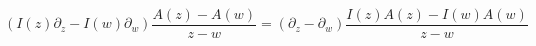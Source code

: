 \begin{equation}
(I(z) \partial_z-I(w) \partial_w)\frac{A(z)-A(w)}{z-w}  = (\partial_z-
\partial_w)\frac{I(z)A(z)-I(w)A(w)}{z-w} 
\end{equation}


